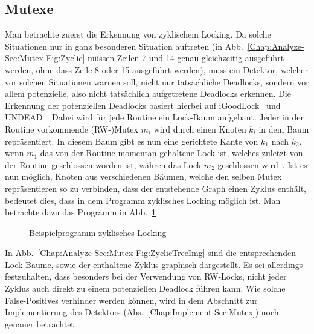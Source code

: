 \subsection{Mutexe}
Man betrachte zuerst die Erkennung von zyklischem Locking. 
Da solche Situationen nur in ganz besonderen Situation auftreten 
(in Abb.~\ref{Chap:Analyze-Sec:Mutex-Fig:Zyclic} müssen Zeilen 
7 und 14 genau gleichzeitig ausgeführt werden, ohne dass Zeile 8 oder 15 ausgeführt werden), muss 
ein Detektor, welcher vor solchen Situationen warnen soll, nicht nur tatsächliche Deadlocks, sondern
vor allem potenzielle, also nicht tatsächlich aufgetretene Deadlocks erkennen. Die Erkennung der 
potenziellen Deadlocks basiert hierbei auf iGoodLock~\cite{iGoodLock} und UNDEAD~\cite{Undead}. 
Dabei wird für jede Routine ein Lock-Baum aufgebaut. Jeder in der Routine vorkommende 
(RW-)Mutex $m_i$ wird durch einen Knoten $k_i$ in dem Baum repräsentiert. 
In diesem Baum gibt es nun eine gerichtete Kante von $k_1$ nach $k_2$, wenn 
$m_1$ das
von der Routine momentan gehaltene Lock ist, welches zuletzt von der Routine 
geschlossen worden ist, währen das Lock $m_2$ geschlossen wird~\cite{lock-tree}.
Ist es nun möglich, Knoten aus verschiedenen Bäumen, welche den selben
Mutex repräsentieren so zu verbinden, dass der entstehende Graph einen Zyklus 
enthält, bedeutet dies, dass in dem Programm zyklisches Locking möglich ist. 
Man betrachte dazu das Programm in Abb.~\ref{Chap:Analyze-Sec:Mutex-Fig:ZyclicTreeCode}
\begin{figure}[h!]
  
  \caption{Beispielprogramm zyklisches Locking}
  \label{Chap:Analyze-Sec:Mutex-Fig:ZyclicTreeCode}
\end{figure}
In Abb.~\ref{Chap:Analyze-Sec:Mutex-Fig:ZyclicTreeImg} sind die entsprechenden
Lock-Bäume, sowie der enthaltene Zyklus graphisch dargestellt. Es sei allerdings 
festzuhalten, dass besonders bei der Verwendung von RW-Locks, nicht jeder 
Zyklus auch direkt zu einem potenziellen Deadlock führen kann. Wie solche 
False-Positives verhinder werden können, wird in dem Abschnitt zur Implementierung
des Detektors (Abs.~\ref{Chap:Implement-Sec:Mutex}) noch genauer betrachtet.

